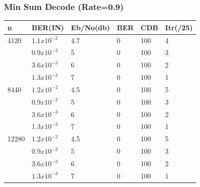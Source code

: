 \documentclass[xcolor=dvipsname]
{beamer}
\begin{document}
\begin{frame}[t] 
\frametitle{Min Sum Decode (Rate=0.9)}

\begin{table}[]
\centering
\begin{tabular}{|l|l|l|l|l|l|}
\hline
n     & BER(IN) & Eb/No(db) & BER & CDB & Itr(/25) \\ \hline
4120  & $1.1x10^{-2}$ & 4.7     & 0   & 100 & 4         \\  \hline
      & $0.9x10^{-2}$ & 5     & 0   & 100 & 3         \\ 
      & $3.6x10^{-3}$ & 6     & 0   & 100 & 2         \\ 
      & $1.3x10^{-3}$ & 7     & 0   & 100 & 1         \\ \hline
8440  & $1.2x10^{-2}$ & 4.5     & 0   & 100 & 5         \\  \hline
      & $0.9x10^{-2}$ & 5     & 0   & 100 & 3         \\ 
      & $3.6x10^{-3}$ & 6     & 0   & 100 & 2         \\ 
      & $1.3x10^{-3}$ & 7     & 0   & 100 & 1         \\ \hline
12280 & $1.2x10^{-2}$ & 4.5     & 0   & 100 & 5         \\  \hline
      & $0.9x10^{-2}$ & 5     & 0   & 100 & 3         \\ 
      & $3.6x10^{-3}$ & 6     & 0   & 100 & 2         \\ 
      & $1.3x10^{-3}$ & 7     & 0   & 100 & 1         \\ \hline
\end{tabular}
\end{table}

\end{frame}
\end{document}
